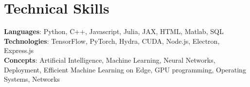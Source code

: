 \section{Technical Skills}
    \begin{itemize}[leftmargin=0.15in, label={}]
	\small{\item{
		\textbf{Languages}{: Python, C++, Javascript, Julia, JAX, HTML, Matlab, SQL} \\
		\textbf{Technologies}{: TensorFlow, PyTorch, Hydra, CUDA, Node.js, Electron, Express.js} \\
		\textbf{Concepts}{: Artificial Intelligence, Machine Learning, Neural Networks, Deployment, Efficient Machine Learning on Edge, GPU programming, Operating Systems, Networks}
	}}
    \end{itemize}